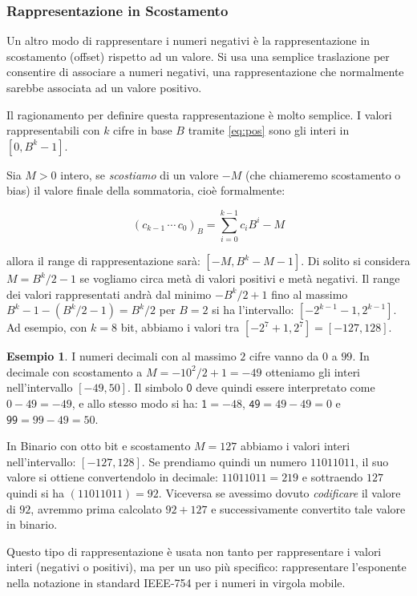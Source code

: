 \documentclass[a4paper]{book}
\theoremstyle{definition}
\newtheorem{ex}{Esempio}
\begin{document}
\subsubsection{Rappresentazione in Scostamento}

Un altro modo di rappresentare i numeri negativi è la rappresentazione in scostamento (offset) rispetto ad un valore. Si usa una semplice traslazione
per consentire di associare a numeri negativi, una rappresentazione che normalmente sarebbe associata ad un valore positivo.
 
Il ragionamento per definire questa rappresentazione è molto semplice. I valori
rappresentabili con $k$ cifre in base $B$ tramite \eqref{eq:pos} sono gli interi in $[0,B^k-1]$. 

Sia $M > 0$ intero, se \emph{scostiamo} di un valore $-M$ (che chiameremo scostamento o bias) il valore finale della sommatoria, cioè formalmente:

\[ (c_{k-1}\,\cdots\,c_{0})_B = \sum_{i=0}^{k-1} c_iB^i - M \] 

\noindent allora il range di rappresentazione sarà: $[-M,B^k-M-1]$. Di solito
si considera $M = B^k/2-1$ se vogliamo circa metà di valori positivi e metà negativi. Il range dei valori rappresentati andrà dal minimo $-B^k/2+1$ fino al massimo $B^k-1-(B^k/2-1) = B^k/2$ per $B=2$ si ha l'intervallo: $[-2^{k-1}-1,2^{k-1}]$. Ad esempio, con $k = 8$ bit, abbiamo i valori tra $[-2^7+1,2^7] = [-127,128]$.

\begin{ex} I numeri decimali con al massimo $2$ cifre vanno da $0$ a $99$. In decimale con scostamento a $M = -10^2/2 + 1 = -49$ otteniamo gli interi nell'intervallo $[-49,50]$. Il simbolo $\mathsf 0$ deve quindi essere interpretato come $0-49 = -49$, e allo stesso modo si ha: $\mathsf{1} = -48$, $\mathsf{49} = 49 - 49 = 0$ e $\mathsf{99} = 99 - 49 = 50$.

In Binario con otto bit e scostamento $M = 127$ abbiamo i valori interi nell'intervallo: $[-127,128]$. Se prendiamo quindi un numero $11011011$, il suo valore si ottiene convertendolo in decimale:
$11011011 = 219$ e sottraendo $127$ quindi si ha $(11011011) = 92$. Viceversa se avessimo dovuto \emph{codificare} il valore di $92$, avremmo prima calcolato $92+127$ e successivamente convertito tale valore in binario.
\end{ex}	

Questo tipo di rappresentazione è usata non tanto per rappresentare i valori interi (negativi o positivi), ma per un uso più specifico: rappresentare l'esponente nella notazione in standard \textrm{IEEE-754} per i numeri in virgola mobile.
\end{document}
